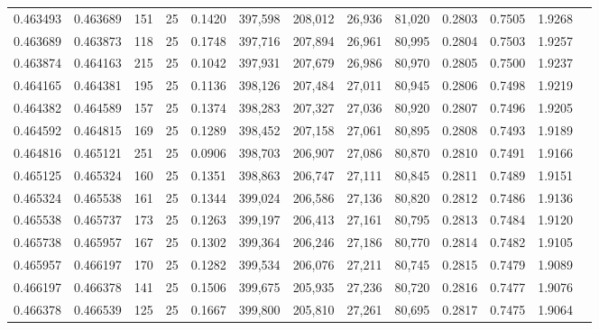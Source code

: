\begin{tabular}{rrrrrrrrrrrrr}
0.463493 & 0.463689 &   151 &  25 &                                     0.1420 & 397,598 & 208,012 &  26,936 &  81,020 & 0.2803 & 0.7505 & 1.9268 \\
0.463689 & 0.463873 &   118 &  25 &                                     0.1748 & 397,716 & 207,894 &  26,961 &  80,995 & 0.2804 & 0.7503 & 1.9257 \\
0.463874 & 0.464163 &   215 &  25 &                                     0.1042 & 397,931 & 207,679 &  26,986 &  80,970 & 0.2805 & 0.7500 & 1.9237 \\
0.464165 & 0.464381 &   195 &  25 &                                     0.1136 & 398,126 & 207,484 &  27,011 &  80,945 & 0.2806 & 0.7498 & 1.9219 \\
0.464382 & 0.464589 &   157 &  25 &                                     0.1374 & 398,283 & 207,327 &  27,036 &  80,920 & 0.2807 & 0.7496 & 1.9205 \\
0.464592 & 0.464815 &   169 &  25 &                                     0.1289 & 398,452 & 207,158 &  27,061 &  80,895 & 0.2808 & 0.7493 & 1.9189 \\
0.464816 & 0.465121 &   251 &  25 &                                     0.0906 & 398,703 & 206,907 &  27,086 &  80,870 & 0.2810 & 0.7491 & 1.9166 \\
0.465125 & 0.465324 &   160 &  25 &                                     0.1351 & 398,863 & 206,747 &  27,111 &  80,845 & 0.2811 & 0.7489 & 1.9151 \\
0.465324 & 0.465538 &   161 &  25 &                                     0.1344 & 399,024 & 206,586 &  27,136 &  80,820 & 0.2812 & 0.7486 & 1.9136 \\
0.465538 & 0.465737 &   173 &  25 &                                     0.1263 & 399,197 & 206,413 &  27,161 &  80,795 & 0.2813 & 0.7484 & 1.9120 \\
0.465738 & 0.465957 &   167 &  25 &                                     0.1302 & 399,364 & 206,246 &  27,186 &  80,770 & 0.2814 & 0.7482 & 1.9105 \\
0.465957 & 0.466197 &   170 &  25 &                                     0.1282 & 399,534 & 206,076 &  27,211 &  80,745 & 0.2815 & 0.7479 & 1.9089 \\
0.466197 & 0.466378 &   141 &  25 &                                     0.1506 & 399,675 & 205,935 &  27,236 &  80,720 & 0.2816 & 0.7477 & 1.9076 \\
0.466378 & 0.466539 &   125 &  25 &                                     0.1667 & 399,800 & 205,810 &  27,261 &  80,695 & 0.2817 & 0.7475 & 1.9064 \\

\end{tabular}
